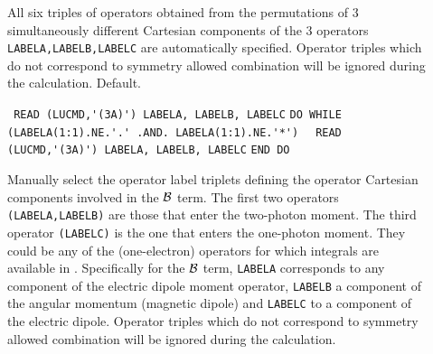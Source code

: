 \begin{description}
\item[] 
All six triples of operators obtained from the
permutations of 3 simultaneously different 
Cartesian components of the 3 operators 
\verb+LABELA,LABELB,LABELC+ are automatically specified.
Operator triples which do not correspond to symmetry allowed
combination will be ignored during the calculation.
Default.

\item[] \verb| |\newline
\verb|READ (LUCMD,'(3A)') LABELA, LABELB, LABELC|\newline
\verb|DO WHILE (LABELA(1:1).NE.'.' .AND. LABELA(1:1).NE.'*')|\newline
\verb|  READ (LUCMD,'(3A)') LABELA, LABELB, LABELC|\newline
\verb|END DO|
%

Manually select the operator label triplets defining the operator
Cartesian components involved in the ${\cal B}$ term. 
The first two operators \verb+(LABELA,LABELB)+
are those that enter the two-photon moment.
The third operator \verb+(LABELC)+ 
is the one that enters the one-photon 
moment. They could be any of the (one-electron)
operators for which integrals are available in 
.
Specifically for the ${\cal{B}}$ term, \verb+LABELA+
corresponds to any component of the electric dipole 
moment operator, \verb+LABELB+ a component of the
angular momentum (magnetic dipole) and
\verb+LABELC+ to a component of the electric dipole.
Operator triples which do not correspond to symmetry allowed
combination will be ignored during the calculation.


\end{description}
